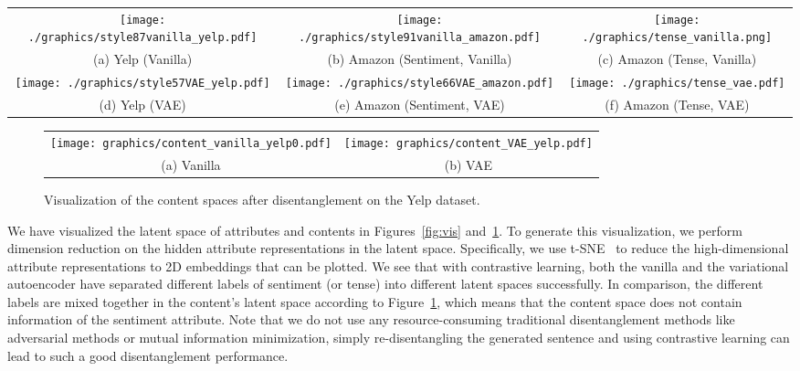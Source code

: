\documentclass[11pt,a4paper]{article}
\renewcommand{\cite}{\citep}
\begin{document}
\begin{figure*}[!t]
    \centering
    \begin{tabular}{ccc}
\texttt{[image: ./graphics/style87vanilla\_yelp.pdf]}\!\!\!\!\!\! & \texttt{[image: ./graphics/style91vanilla\_amazon.pdf]}\!\!\!\!\!\! & \texttt{[image: ./graphics/tense\_vanilla.png]}\\
(a) Yelp  (Vanilla) & (b) Amazon  (Sentiment, Vanilla) & (c) Amazon  (Tense, Vanilla) \\
\texttt{[image: ./graphics/style57VAE\_yelp.pdf]}\!\!\!\!\!\! & \texttt{[image: ./graphics/style66VAE\_amazon.pdf]}\!\!\!\!\!\! & \texttt{[image: ./graphics/tense\_vae.pdf]}\\
(d) Yelp  (VAE) & (e) Amazon  (Sentiment, VAE) & (f) Amazon  (Tense, VAE)
\end{tabular}
    \caption{Visualization of the disentangled latent space for the two style types: sentiment and tense. (a), (b), and (c) are created by a vanilla autoencoder, while (d), (e), and (f) are created by a VAE. All results are obtained when $\tau$ is set to $100$. }
    \label{fig:vis}%
\end{figure*}

\begin{figure}
    \centering
    \begin{tabular}{cc}
    \texttt{[image: graphics/content\_vanilla\_yelp0.pdf]}&\texttt{[image: graphics/content\_VAE\_yelp.pdf]}\\
    (a) Vanilla  & (b) VAE\\
    \end{tabular}
    \caption{Visualization of the content spaces after disentanglement on the Yelp dataset.}
    \label{fig:viscontent}
\end{figure}

We have visualized the latent space of attributes and contents in Figures~\ref{fig:vis} and~\ref{fig:viscontent}. To generate this visualization, we perform dimension reduction on the hidden attribute representations in the latent space. Specifically, we use t-SNE~\cite{JMLR:v9:vandermaaten08a} to reduce the high-dimensional attribute representations to 2D embeddings that can be plotted.  We see that with  contrastive learning,  both the vanilla and the variational autoencoder have separated different labels of sentiment (or tense) into different latent spaces successfully.  In comparison, the different labels are mixed together in the content's latent space according to Figure~\ref{fig:viscontent}, which means that the content space does not contain information of the sentiment attribute. Note that we do not use any resource-consuming traditional disentanglement methods like adversarial methods or mutual information minimization, simply re-disentangling the generated sentence and using  contrastive learning can lead to such a good disentanglement performance.
\end{document}
